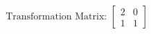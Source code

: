 \documentclass[preview]{standalone}
\begin{document}
\begin{align*}
\text{Transformation Matrix: } \begin{bmatrix} 2 & 0 \\ 1 & 1 \end{bmatrix}
\end{align*}
\end{document}

